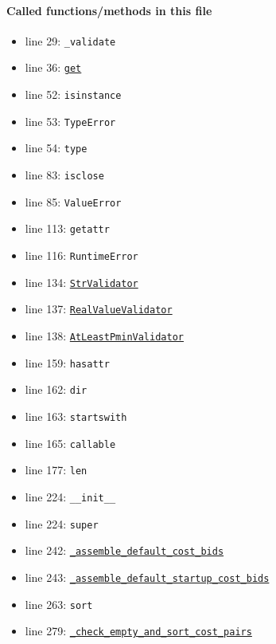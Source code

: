 \documentclass[11pt]{report}
\begin{document}
\paragraph{Called functions/methods in this file}
\begin{itemize}[leftmargin=*]
  \item line 29: \texttt{\_validate}
  \item line 36: \hyperref[def:tests-test_backcaster.py:DAPrices.get:L294]{\texttt{get}}
  \item line 52: \texttt{isinstance}
  \item line 53: \texttt{TypeError}
  \item line 54: \texttt{type}
  \item line 83: \texttt{isclose}
  \item line 85: \texttt{ValueError}
  \item line 113: \texttt{getattr}
  \item line 116: \texttt{RuntimeError}
  \item line 134: \hyperref[def:model_data.py:StrValidator:L49]{\texttt{StrValidator}}
  \item line 137: \hyperref[def:model_data.py:RealValueValidator:L58]{\texttt{RealValueValidator}}
  \item line 138: \hyperref[def:model_data.py:AtLeastPminValidator:L97]{\texttt{AtLeastPminValidator}}
  \item line 159: \texttt{hasattr}
  \item line 162: \texttt{dir}
  \item line 163: \texttt{startswith}
  \item line 165: \texttt{callable}
  \item line 177: \texttt{len}
  \item line 224: \texttt{\_\_init\_\_}
  \item line 224: \texttt{super}
  \item line 242: \hyperref[def:model_data.py:ThermalGeneratorModelData._assemble_default_cost_bids:L267]{\texttt{\_assemble\_default\_cost\_bids}}
  \item line 243: \hyperref[def:model_data.py:ThermalGeneratorModelData._assemble_default_startup_cost_bids:L303]{\texttt{\_assemble\_default\_startup\_cost\_bids}}
  \item line 263: \texttt{sort}
  \item line 279: \hyperref[def:model_data.py:ThermalGeneratorModelData._check_empty_and_sort_cost_pairs:L245]{\texttt{\_check\_empty\_and\_sort\_cost\_pairs}}
\end{itemize}
\end{document}
